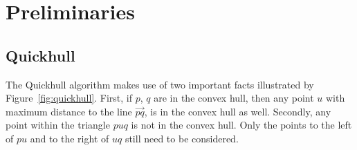 \section{Preliminaries}

\subsection{Quickhull}

The Quickhull algorithm makes use of two important facts 
illustrated by Figure~\ref{fig:quickhull}. First, if $p$, $q$ are in the 
convex hull, then any point $u$ with maximum distance to the line $\vec{pq}$, 
is in the convex hull as well. Secondly, any point within the triangle 
$puq$ is not in the convex hull. Only the points to the left of $pu$ and 
to the right of $uq$ still need to be considered.

\medskip

